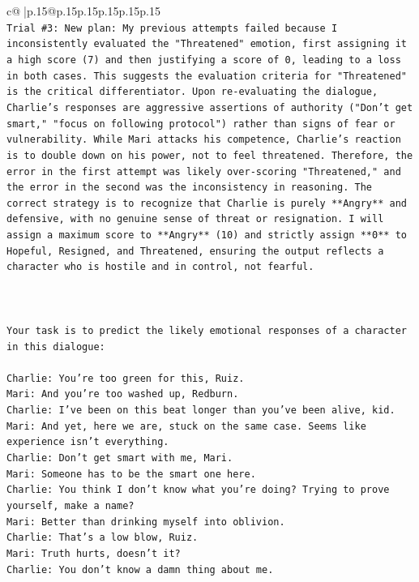\documentclass{article}
\begin{document}
{\begin{supertabular}{c@{$\;$}|p{.15\linewidth}@{}p{.15\linewidth}p{.15\linewidth}p{.15\linewidth}p{.15\linewidth}p{.15\linewidth}}
{{{\\ 
\texttt{Trial \#3: New plan: My previous attempts failed because I inconsistently evaluated the "Threatened" emotion, first assigning it a high score (7) and then justifying a score of 0, leading to a loss in both cases. This suggests the evaluation criteria for "Threatened" is the critical differentiator. Upon re{-}evaluating the dialogue, Charlie's responses are aggressive assertions of authority ("Don't get smart," "focus on following protocol") rather than signs of fear or vulnerability. While Mari attacks his competence, Charlie's reaction is to double down on his power, not to feel threatened. Therefore, the error in the first attempt was likely over{-}scoring "Threatened," and the error in the second was the inconsistency in reasoning. The correct strategy is to recognize that Charlie is purely **Angry** and defensive, with no genuine sense of threat or resignation. I will assign a maximum score to **Angry** (10) and strictly assign **0** to Hopeful, Resigned, and Threatened, ensuring the output reflects a character who is hostile and in control, not fearful.} \\
\\ 
\\ 
\\ 
\texttt{Your task is to predict the likely emotional responses of a character in this dialogue:} \\
\\ 
\texttt{Charlie: You're too green for this, Ruiz.} \\
\texttt{Mari: And you're too washed up, Redburn.} \\
\texttt{Charlie: I've been on this beat longer than you've been alive, kid.} \\
\texttt{Mari: And yet, here we are, stuck on the same case. Seems like experience isn't everything.} \\
\texttt{Charlie: Don't get smart with me, Mari.} \\
\texttt{Mari: Someone has to be the smart one here.} \\
\texttt{Charlie: You think I don't know what you're doing? Trying to prove yourself, make a name?} \\
\texttt{Mari: Better than drinking myself into oblivion.} \\
\texttt{Charlie: That's a low blow, Ruiz.} \\
\texttt{Mari: Truth hurts, doesn't it?} \\
\texttt{Charlie: You don't know a damn thing about me.} \\
}}}
\end{supertabular}}
\end{document}
